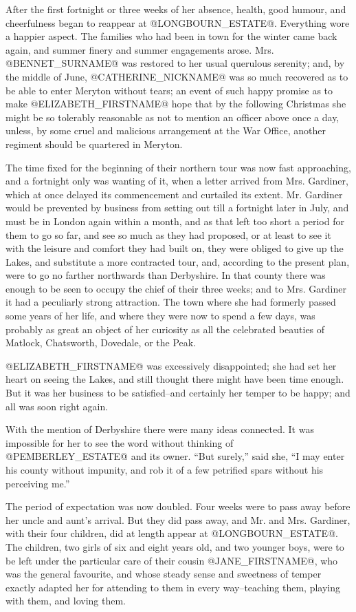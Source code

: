 After the first fortnight or three weeks of her absence, health, good
humour, and cheerfulness began to reappear at @LONGBOURN_ESTATE@. Everything wore
a happier aspect. The families who had been in town for the winter came
back again, and summer finery and summer engagements arose. Mrs. @BENNET_SURNAME@
was restored to her usual querulous serenity; and, by the middle of
June, @CATHERINE_NICKNAME@ was so much recovered as to be able to enter Meryton without
tears; an event of such happy promise as to make @ELIZABETH_FIRSTNAME@ hope that by
the following Christmas she might be so tolerably reasonable as not to
mention an officer above once a day, unless, by some cruel and malicious
arrangement at the War Office, another regiment should be quartered in
Meryton.

The time fixed for the beginning of their northern tour was now fast
approaching, and a fortnight only was wanting of it, when a letter
arrived from Mrs. Gardiner, which at once delayed its commencement and
curtailed its extent. Mr. Gardiner would be prevented by business from
setting out till a fortnight later in July, and must be in London again
within a month, and as that left too short a period for them to go so
far, and see so much as they had proposed, or at least to see it with
the leisure and comfort they had built on, they were obliged to give up
the Lakes, and substitute a more contracted tour, and, according to the
present plan, were to go no farther northwards than Derbyshire. In that
county there was enough to be seen to occupy the chief of their three
weeks; and to Mrs. Gardiner it had a peculiarly strong attraction. The
town where she had formerly passed some years of her life, and where
they were now to spend a few days, was probably as great an object of
her curiosity as all the celebrated beauties of Matlock, Chatsworth,
Dovedale, or the Peak.

@ELIZABETH_FIRSTNAME@ was excessively disappointed; she had set her heart on seeing
the Lakes, and still thought there might have been time enough. But it
was her business to be satisfied--and certainly her temper to be happy;
and all was soon right again.

With the mention of Derbyshire there were many ideas connected. It was
impossible for her to see the word without thinking of @PEMBERLEY_ESTATE@ and its
owner. ``But surely,'' said she, ``I may enter his county without impunity,
and rob it of a few petrified spars without his perceiving me.''

The period of expectation was now doubled. Four weeks were to pass away
before her uncle and aunt's arrival. But they did pass away, and Mr.
and Mrs. Gardiner, with their four children, did at length appear at
@LONGBOURN_ESTATE@. The children, two girls of six and eight years old, and two
younger boys, were to be left under the particular care of their
cousin @JANE_FIRSTNAME@, who was the general favourite, and whose steady sense and
sweetness of temper exactly adapted her for attending to them in every
way--teaching them, playing with them, and loving them.

